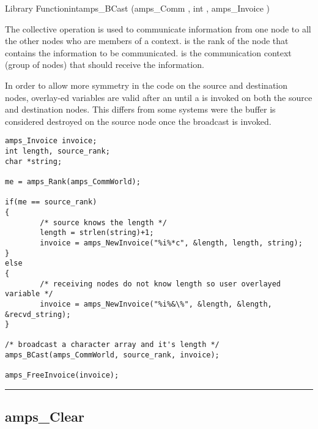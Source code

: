 \begin{deftypefn}{Library Function}{int}{amps\_BCast}
(amps_Comm , int , amps_Invoice ) 

\DESCRIPTION

The collective operation  is used to communicate 
information from one node to all the other nodes who are members
of a context.   is the rank of the node that contains
the information to be communicated.   is the communication
context (group of nodes) that should receive the information.

In order to allow more symmetry in the code on the source and destination
nodes, overlay-ed variables are valid after an  until a
 is invoked on both the source and destination
nodes.  This differs from some systems were the buffer is considered
destroyed on the source node once the broadcast is invoked.

\EXAMPLE

\begin{display}\begin{verbatim}
amps_Invoice invoice;
int length, source_rank;
char *string;

me = amps_Rank(amps_CommWorld);

if(me == source_rank)
{
        /* source knows the length */
        length = strlen(string)+1;
        invoice = amps_NewInvoice("%i%*c", &length, length, string);
}
else
{
        /* receiving nodes do not know length so user overlayed variable */
        invoice = amps_NewInvoice("%i%&\%", &length, &length, &recvd_string);
}

/* broadcast a character array and it's length */
amps_BCast(amps_CommWorld, source_rank, invoice);

amps_FreeInvoice(invoice);
\end{verbatim}\end{display}

\end{deftypefn}

\noindent\rule{\textwidth}{1mm}

\subsection{amps\_Clear}
\label{amps_Clear}

